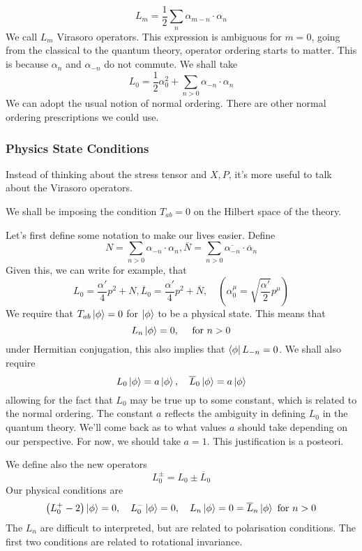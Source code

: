 \documentclass[11pt, oneside]{article}   	%
\theoremstyle{slanted}
\begin{document}
\[
 L _ m  = \frac{1}{2 } \sum_ n \alpha _{ m - n } \cdot  \alpha _ n 
\] 
We call $ L _ m $ Virasoro 
operators. This expression is 
ambiguous for $ m   = 0 $, 
going from the classical to the quantum theory, 
operator ordering starts to matter.
 This is because $ \alpha _ n $ and $ \alpha _{  - n  } $
 do not commute. 
 We shall take 
 \[
   L _ 0  = \frac{1}{2 } \alpha _ 0 ^ 2 + \sum _{ n > 0  } \alpha 
   _{ -n  } \cdot  \alpha _ n 
 \] 
 We can adopt the usual notion of 
 normal ordering. 
 There are other normal ordering prescriptions 
 we could use.

 \subsubsection{Physics State Conditions}
 Instead of thinking about 
 the stress tensor and $ X  , P $, it's
 more useful to talk about 
 the Virasoro operators. 

 We shall be imposing 
 the condition $ T_{ ab }  = 0 $ on the 
 Hilbert space of the theory. 

 Let's first define 
 some notation to make our lives easier. 
 Define 
 \[
  N  = \sum _{ n > 0 } \alpha _{  -n  } \cdot \alpha _ n , 
  \overline{ N }  = \sum _{ n > 0 } \overline{\alpha _{ - n }}  \cdot  
  \overline{\alpha} _ n 
 \] 
 Given this, 
 we can write for example, that
 \[
  L_0 = \frac{\alpha ' }{ 4 } p ^2 + N , 
  \overline{ L } _ 0   = \frac{\alpha '  }{ 4 } p ^ 2 + \overline{ N } , 
  \quad \left( \alpha _ 0 ^ \mu  = \sqrt{ \frac{\alpha '  }{ 2 } }  p ^ \mu  \right) 
 \] We require
 that $ T_{ ab   } \ket{ \phi }  = 0 $ 
 for $ \ket{ \phi } $ to be a physical state. 
 This means that 
 \[
  L _ n \ket{ \phi }   = 0, \quad \text{ for } n > 0 
 \] under Hermitian conjugation, this also implies 
 that $ \bra{ \phi } L _{  - n }  = 0  $. 
 We shall also require 
 \[
  L _ 0 \ket{ \phi }  = a \ket{ \phi } , \quad \overline{ L } _ 0 
  \ket{ \phi }  = a \ket{ \phi } 
 \] allowing for the fact that $ L _ 0 $ 
 may be true up to some constant, which is related to 
 the normal ordering. The constant $ a $ reflects 
 the ambiguity in defining $ L_0 $ in the quantum theory. 
We'll come back as to what values $ a $ should take 
depending on our perspective. For 
now, we should take $ a = 1 $. 
This justification is a posteori. 

We define also the new operators 
\[
 L _ 0 ^{ \pm }  = L _ 0 \pm \overline{ L } _ 0 
\] Our physical 
conditions are 
\[
 \left( L_0 ^{ +  }  - 2 \right)  \ket{ \phi }  =0, \quad 
 L_ 0 ^ - \ket{ \phi }  = 0 , \quad L_ n \ket{ \phi }  = 0 
  = \overline{ L } _ n \ket{ \phi } \text{ for  } n > 0 
\] The $ L _ n $ are difficult to interpreted, 
but are related to polarisation 
conditions. The first two conditions 
are related to rotational invariance. 
\end{document}

